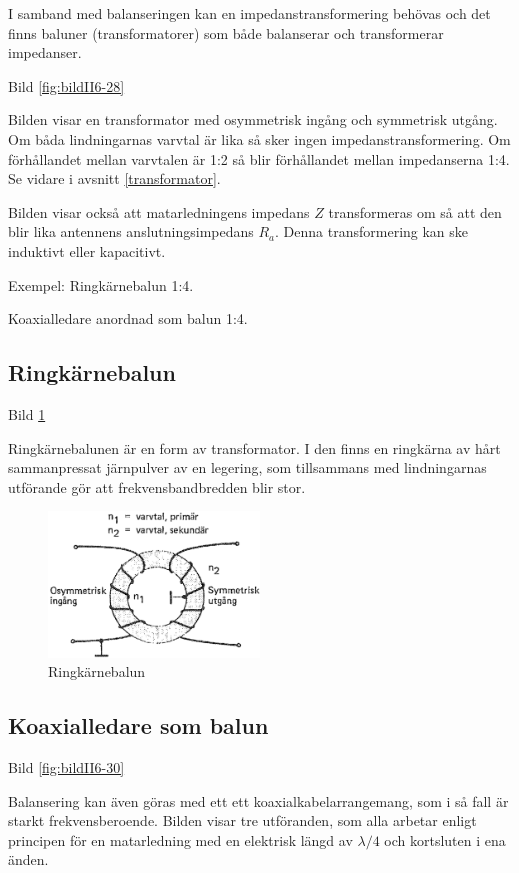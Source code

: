 I samband med balanseringen kan en impedanstransformering behövas och
det finns baluner (transformatorer) som både balanserar och
transformerar impedanser.

Bild \ref{fig:bildII6-28}

Bilden visar en transformator med osymmetrisk ingång och symmetrisk
utgång. Om båda lindningarnas varvtal är lika så sker ingen
impedanstransformering. Om förhållandet mellan varvtalen är 1:2 så
blir förhållandet mellan impedanserna 1:4. Se vidare i avsnitt \ref{transformator}.

Bilden visar också att matarledningens impedans \(Z\) transformeras om så
att den blir lika antennens anslutningsimpedans \(R_a\).  Denna
transformering kan ske induktivt eller kapacitivt.

Exempel:
Ringkärnebalun 1:4.

Koaxialledare anordnad som balun 1:4.

\subsection{Ringkärnebalun}

Bild \ref{fig:bildII6-29}

Ringkärnebalunen är en form av transformator. I den finns en ringkärna
av hårt sammanpressat järnpulver av en legering, som tillsammans med
lindningarnas utförande gör att frekvensbandbredden blir stor.

\begin{figure}
  \includegraphics[width=0.5\textwidth]{images/cropped_pdfs/bild_2_6-29.pdf}
  \caption{Ringkärnebalun}
  \label{fig:bildII6-29}
\end{figure}

\subsection{Koaxialledare som balun}

Bild \ref{fig:bildII6-30}

Balansering kan även göras med ett ett koaxialkabelarrangemang, som i
så fall är starkt frekvensberoende. Bilden visar tre utföranden, som
alla arbetar enligt principen för en matarledning med en elektrisk
längd av \(\lambda/4\) och kortsluten i ena änden.

